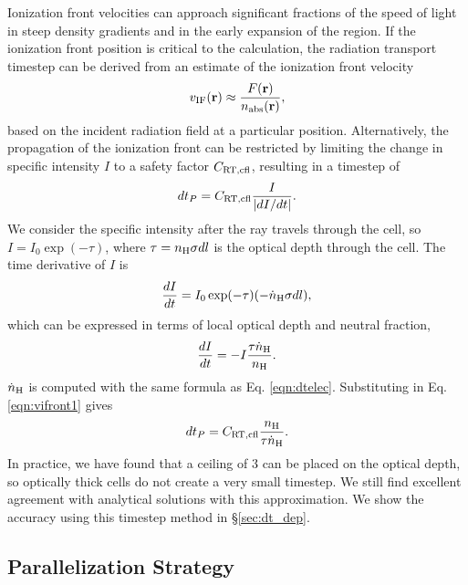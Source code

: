 \documentclass[useAMS,usenatbib,a4paper]{mn2e}
\begin{document}
Ionization front velocities can approach significant fractions of the
speed of light in steep density gradients and in the early expansion
of the \hii region.  If the ionization front position is
critical to the calculation, the radiation transport timestep can be
derived from an estimate of the ionization front velocity
%
\begin{equation}
  \label{eqn:dt_incident}
  v_{\rm IF}(\mathbf{r}) \approx \frac{F(\mathbf{r})}
  {n_{\rm abs}(\mathbf{r})},
\end{equation}
%
based on the incident radiation field at a particular position.
Alternatively, the propagation of the ionization front can be
restricted by limiting the change in specific intensity $I$ to a
safety factor $C_{\rm RT,cfl}$, resulting in a timestep of
%
\begin{equation}
  \label{eqn:vifront1}
  dt_P = C_{\rm RT,cfl} \frac{I}{|dI/dt|}.
\end{equation}
%
We consider the specific intensity after the ray travels through the
cell, so $I = I_0 \exp(-\tau)$, where $\tau = n_{\rm H} \sigma dl$ is
the optical depth through the cell.  The time derivative of $I$ is
%
\begin{equation}
  \label{eqn:vifront2}
  \frac{dI}{dt} = I_0 \exp(-\tau) (-\dot{n}_{\rm H} \sigma dl),
\end{equation}
%
which can be expressed in terms of local optical depth and neutral
fraction,
\begin{equation}
  \label{eqn:vifront3}
    \frac{dI}{dt} = -I \frac{\tau \dot{n}_{\rm H}}{n_{\rm H}}.
\end{equation}
%
$\dot{n}_{\rm H}$ is computed with the same formula as
Eq. \ref{eqn:dtelec}. Substituting in Eq. \ref{eqn:vifront1} gives
%
\begin{equation}
  \label{eqn:vifront4}
  dt_P = C_{\rm RT,cfl} \frac{n_{\rm H}}{\tau \dot{n}_{\rm H}}.
\end{equation}
%
In practice, we have found that a ceiling of 3 can be placed on the
optical depth, so optically thick cells do not create a very small
timestep.  We still find excellent agreement with analytical solutions
with this approximation.  We show the accuracy using this timestep
method in \S\ref{sec:dt_dep}.

\subsection{Parallelization Strategy}
\label{sec:parallel}
\end{document}
